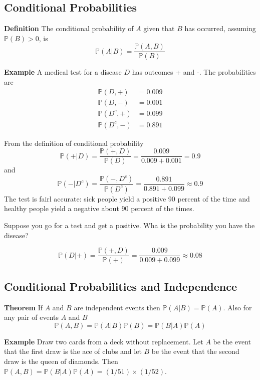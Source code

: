 \documentclass[
]{book}
\theoremstyle{definition}
\theoremstyle{definition}
\theoremstyle{definition}
\theoremstyle{definition}
\theoremstyle{remark}
\begin{document}
\hypertarget{conditional-probabilities}{%
\subsection{Conditional Probabilities}\label{conditional-probabilities}}

\textbf{Definition} The conditional probability of \(A\) given that \(B\) has occurred, assuming \(\mathbb{P}(B)>0\), is
\[
\mathbb{P}(A|B)=\frac{\mathbb{P}(A,B)}{\mathbb{P}(B)}
\]

\textbf{Example} A medical test for a disease \(D\) has outcomes + and -. The probabilities are
\begin{align}
\mathbb{P}(D,+)&=0.009\\
\mathbb{P}(D,-)&=0.001 \\
\mathbb{P}(D^c,+)&=0.099\\
\mathbb{P}(D^c,-)&=0.891
\end{align}

From the definition of conditional probability
\[
\mathbb{P}(+|D)=\frac{\mathbb{P}(+,D)}{\mathbb{P}(D)}=\frac{0.009}{0.009+0.001}=0.9
\]
and
\[
\mathbb{P}(-|D^c)=\frac{\mathbb{P}(-,D^c)}{\mathbb{P}(D^c)}=\frac{0.891}{0.891+0.099}\approx 0.9
\]
The test is fairl accurate: sick people yield a positive 90 percent of the time and healthy people yield a negative about 90 percent of the times.

Suppose you go for a test and get a positive. Wha is the probability you have the disease?

\[
\mathbb{P}(D|+)=\frac{\mathbb{P}(+,D)}{\mathbb{P}(+)}=\frac{0.009}{0.009+0.099}\approx 0.08
\]

\hypertarget{conditional-probabilities-and-independence}{%
\subsection{Conditional Probabilities and Independence}\label{conditional-probabilities-and-independence}}

\textbf{Theorem} If \(A\) and \(B\) are independent events then \(\mathbb{P}(A|B)=\mathbb{P}(A)\). Also for any pair of events \(A\) and \(B\)
\[
\mathbb{P}(A,B)=\mathbb{P}(A|B)\mathbb{P}(B)=\mathbb{P}(B|A)\mathbb{P}(A)
\]

\textbf{Example} Draw two cards from a deck without replacement. Let \(A\) be the event that the first draw is the ace of clubs and let \(B\) be the event that the second draw is the queen of diamonds. Then \(\mathbb{P}(A,B)=\mathbb{P}(B|A)\mathbb{P}(A)=(1/51)\times (1/52)\).
\end{document}
